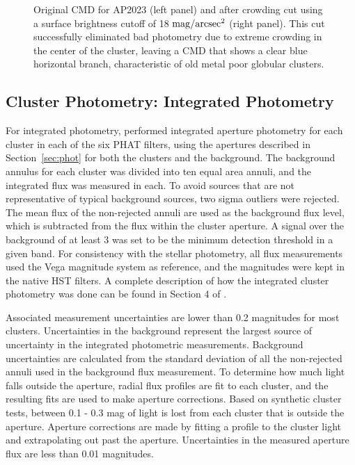 \documentclass{emulateapj}
\begin{document}
\begin{figure}[!htbp]
\caption{Original CMD for AP2023 (left panel) and after crowding cut using a surface brightness cutoff of 18 ${\rm mag/arcsec^2}$ (right panel).  This cut successfully eliminated bad photometry due to extreme crowding in the center of the cluster, leaving a CMD that shows a clear blue horizontal branch, characteristic of old metal poor globular clusters.}
\label{fig:cmdonly}
\end{figure}




\subsection{Cluster Photometry:  Integrated Photometry}\label{sec:int phot}

For integrated photometry, \cite{Johnson15} performed integrated aperture photometry for each cluster in each of the six PHAT filters, using the apertures described in Section~\ref{sec:phot} for both the clusters and the background.  The background annulus for each cluster was divided into ten equal area annuli, and the integrated flux was measured in each.  To avoid sources that are not representative of typical background sources, two sigma outliers were rejected.  The mean flux of the non-rejected annuli are used as the background flux level, which is subtracted from the flux within the cluster aperture.  A signal over the background of at least 3 was set to be the minimum detection threshold in a given band.  For consistency with the stellar photometry, all flux measurements used the Vega magnitude system as reference, and the magnitudes were kept in the native HST filters.  A complete description of how the integrated cluster photometry was done can be found in Section 4 of \cite{Johnson12}.  

Associated measurement uncertainties are lower than 0.2 magnitudes for most clusters.  Uncertainties in the background represent the largest source of uncertainty in the integrated photometric measurements.  Background uncertainties are calculated from the standard deviation of all the non-rejected annuli used in the background flux measurement.  To determine how much light falls outside the aperture, radial flux profiles are fit to each cluster, and the resulting fits are used to make aperture corrections.  Based on synthetic cluster tests, between 0.1 - 0.3 mag of light is lost from each cluster that is outside the aperture.  Aperture corrections are made by fitting a \cite{King62} profile to the cluster light and extrapolating out past the aperture.  Uncertainties in the measured aperture flux are less than 0.01 magnitudes.  
\end{document}
